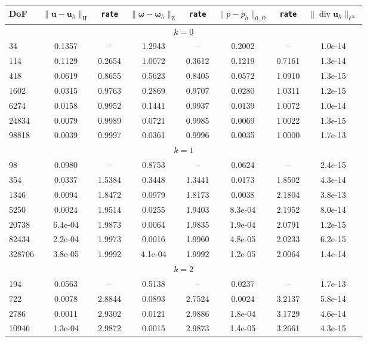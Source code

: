 \documentclass[reqno,a4paper]{article}
\numberwithin{equation}{section}
\newcommand\bu{\boldsymbol{u}}
\renewcommand\H{\mathrm{H}}
\newcommand\Z{\mathrm{Z}}
\newcommand\vdiv{\mathop{\mathrm{div}}\nolimits}
\newcommand\bomega{\boldsymbol{\omega}}
\begin{document}
\begin{table}[t]
\begin{center}
{\small\begin{tabular}{|l|c|c|c|c|c|c|c|}
\hline
DoF  &    $\|\bu-\bu_h\|_{\H}$  &  \texttt{rate} &  $\|\bomega-\bomega_h\|_{\Z}$  
&   \texttt{rate}  &  $\|p-p_h\|_{0,\Omega}$  &  \texttt{rate} & $\|\vdiv\bu_h\|_{\ell^\infty}$ \\  
\hline
\multicolumn{8}{|c|}{$k=0$}\\
\hline
34  & 0.1357 &    -- & 1.2943 &     -- & 0.2002 &    --  & 1.0e-14\\
114 & 0.1129 & 0.2654 & 1.0072 & 0.3612 & 0.1219 & 0.7161 & 1.3e-14\\
418 & 0.0619 & 0.8655 & 0.5623 & 0.8405 & 0.0572 & 1.0910 & 1.3e-15\\
1602  & 0.0315 & 0.9763 & 0.2869 & 0.9707 & 0.0280 & 1.0311 &1.2e-15 \\
6274 & 0.0158 & 0.9952 & 0.1441 & 0.9937 & 0.0139 & 1.0072 & 1.0e-14\\
24834 & 0.0079 & 0.9989 & 0.0721 & 0.9985 & 0.0069 & 1.0022 & 1.3e-15\\
98818 & 0.0039 & 0.9997 & 0.0361 & 0.9996 & 0.0035 &    1.0000& 1.7e-13\\
\hline
\multicolumn{8}{|c|}{$k=1$}\\
\hline
98 & 0.0980 &   -- & 0.8753 &    -- & 0.0624 &   -- & 2.4e-15\\
354 & 0.0337 & 1.5384 & 0.3448 & 1.3441 & 0.0173 & 1.8502 &4.3e-14 \\
1346 & 0.0094 & 1.8472 & 0.0979 & 1.8173 & 0.0038 & 2.1804 & 3.8e-13\\
5250 & 0.0024 & 1.9514 & 0.0255 & 1.9403 & 8.3e-04 & 2.1952 & 8.0e-14\\
20738 & 6.4e-04 & 1.9873 & 0.0064 & 1.9835 & 1.9e-04 & 2.0791 & 1.2e-15\\
82434 & 2.2e-04 & 1.9973 & 0.0016 & 1.9960 & 4.8e-05 & 2.0233 & 6.2e-15\\
328706 & 3.8e-05 & 1.9992 & 4.1e-04 & 1.9992 & 1.2e-05 & 2.0064&1.4e-14\\
\hline
\multicolumn{8}{|c|}{$k=2$}\\
\hline
194 & 0.0563 &   -- & 0.5138 &   -- & 0.0237 &   -- & 1.7e-13\\
722 & 0.0078 & 2.8844 & 0.0893 & 2.7524 & 0.0024 & 3.2137 &5.8e-14 \\
2786  & 0.0011 & 2.9302 & 0.0121 & 2.9886 & 1.8e-04 & 3.1729 & 4.6e-14\\
10946 & 1.3e-04 & 2.9872 & 0.0015 & 2.9873 & 1.4e-05 & 3.2661& 4.3e-15\\

\end{tabular}}
\end{center}
\end{table}
\end{document}
